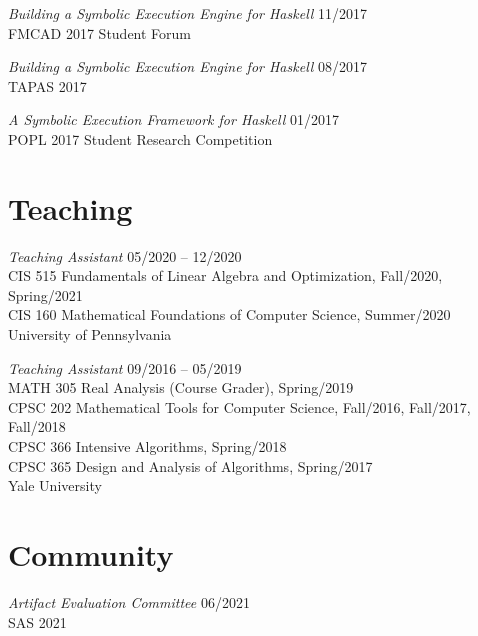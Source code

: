 \documentclass[margin]{res}
\begin{document}
\begin{resume}
\textit{Building a Symbolic Execution Engine for Haskell} \hfill 11/2017 \\
  FMCAD 2017 Student Forum

\textit{Building a Symbolic Execution Engine for Haskell} \hfill 08/2017 \\
  TAPAS 2017

\textit{A Symbolic Execution Framework for Haskell} \hfill 01/2017 \\
  POPL 2017 Student Research Competition


\section{Teaching}
\textit{Teaching Assistant}
  \hfill 05/2020 -- 12/2020 \\
    {CIS 515 Fundamentals of Linear Algebra and Optimization},
      Fall/2020, Spring/2021 \\
    {CIS 160 Mathematical Foundations of Computer Science},
      Summer/2020 \\
University of Pennsylvania

\textit{Teaching Assistant}
  \hfill 09/2016 -- 05/2019 \\
    {MATH 305 Real Analysis (Course Grader)},
      Spring/2019 \\
    {CPSC 202 Mathematical Tools for Computer Science},
      Fall/2016, Fall/2017, Fall/2018 \\
    {CPSC 366 Intensive Algorithms},
      Spring/2018 \\
    {CPSC 365 Design and Analysis of Algorithms},
      Spring/2017 \\
Yale University

\section{Community}
\textit{Artifact Evaluation Committee} \hfill 06/2021 \\
SAS 2021


\end{resume}
\end{document}
